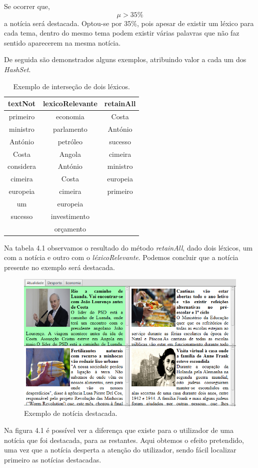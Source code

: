 Se ocorrer que, \begin{equation}
    \mu>35\%
\end{equation}
a notícia será destacada. Optou-se por 35\%, pois apesar de existir um léxico para cada tema, dentro do mesmo tema podem existir várias palavras que não faz sentido aparecerem  na mesma notícia.

De seguida são demonstrados alguns exemplos, atribuindo valor a cada um dos \emph{HashSet}.
\begin{table}[H]
\centering
\begin{tabular}{|c|c||c|}
\hline
\textbf{textNot} & \textbf{lexicoRelevante} & \textbf{retainAll}\\
\hline
\hline
primeiro & economia & Costa \\
\hline
ministro & parlamento &  António\\
\hline
António &  petróleo & sucesso\\
\hline
Costa &  Angola & cimeira\\
\hline
considera &  António & ministro\\
\hline
cimeira &  Costa & europeia\\
\hline
europeia &  cimeira & primeiro\\
\hline
um  & europeia&\\
\hline
sucesso &  investimento &\\
\hline
 & orçamento & \\
\hline
\end{tabular}
\caption{Exemplo de interseção de dois léxicos.}
\label{tab:exemplo}
\end{table}

Na tabela 4.1 observamos o resultado do método \emph{retainAll}, dado dois léxicos, um com a notícia e outro com o \emph{léxicoRelevante}. Podemos concluir que a notícia presente no exemplo será destacada.


\vspace{0,07cm}
\begin{figure}[H]
\centering
\includegraphics[scale=0.5]{imagens/new_destak.PNG}
\caption{Exemplo de notícia destacada.}
\label{fig:gestao}
\end{figure}
Na figura 4.1 é possível ver a diferença que existe para o utilizador de uma notícia que foi destacada, para as restantes. Aqui obtemos o efeito pretendido, uma vez que a notícia desperta a atenção do utilizador, sendo fácil localizar primeiro as notícias destacadas.\par



